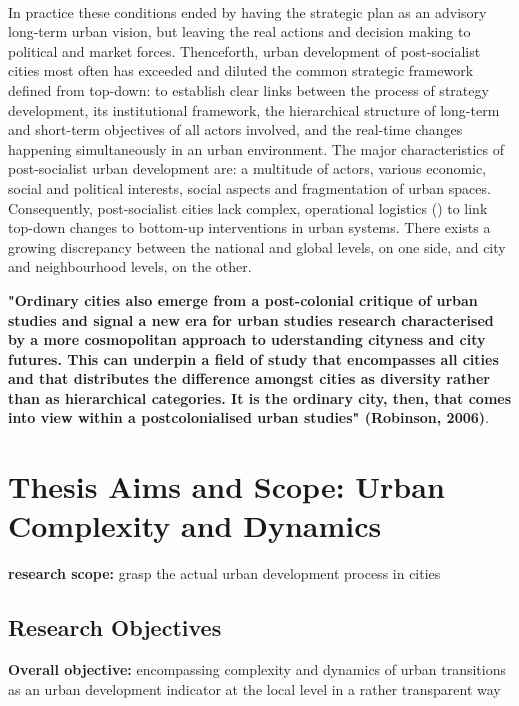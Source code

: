 \documentclass[11pt]{report}
\begin{document}
\\
In practice these conditions ended by having the strategic plan as an advisory long-term urban vision, but leaving the real actions and decision making to political and market forces. Thenceforth, urban development of post-socialist cities most often has exceeded and diluted the common strategic framework defined from top-down: to establish clear links between the process of strategy development, its institutional framework, the hierarchical structure of long-term and short-term objectives of all actors involved, and the real-time changes happening simultaneously in an urban environment. The major characteristics of post-socialist urban development are: a multitude of actors, various economic, social and political interests, social aspects and fragmentation of urban spaces. Consequently, post-socialist cities lack complex, operational logistics (\href{check!!!Repetti et al. 2010}{\citealt{check!!!Repetti et al. 2010}}) to link top-down changes to bottom-up interventions in urban systems. There exists a growing discrepancy between the national and global levels, on one side, and city and neighbourhood levels, on the other. 

\textbf{"Ordinary cities also emerge from a post-colonial critique of urban studies and signal a new era for urban studies research characterised by a more cosmopolitan approach to uderstanding cityness and city futures. This can underpin a field of study that encompasses all cities and that distributes the difference amongst cities as diversity rather than as hierarchical categories. It is the ordinary city, then, that comes into view within a postcolonialised urban studies" (Robinson, 2006)}.

\section{Thesis Aims and Scope: Urban Complexity and Dynamics}
\textbf{research scope:} grasp the actual urban development process in cities

\subsection{Research Objectives}
\textbf{Overall objective:} encompassing complexity and dynamics of urban transitions as an urban development indicator at the local level in a rather transparent way
\\
\end{document}
